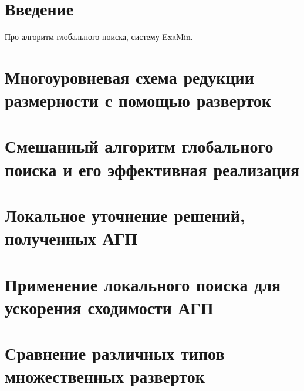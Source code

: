 \section{Введение}
Про алгоритм глобального поиска, систему ExaMin.
\section{Многоуровневая схема редукции размерности с помощью разверток}

\section{Смешанный алгоритм глобального поиска и его эффективная реализация}

\section{Локальное уточнение решений, полученных АГП}

\section{Применение локального поиска для ускорения сходимости АГП}

\section{Сравнение различных типов множественных разверток}
